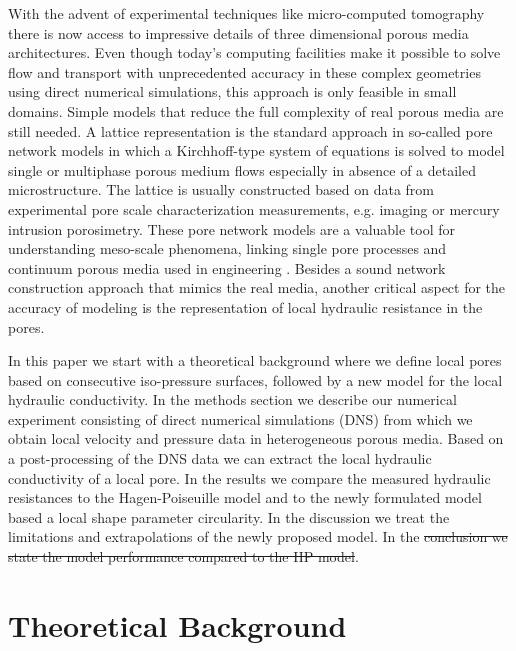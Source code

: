 \documentclass[draft]{agujournal2019}
\providecommand{\DIFadd}[1]{{\protect\color{blue}\uwave{#1}}} %
\providecommand{\DIFdel}[1]{{\protect\color{red}\sout{#1}}}                      %
\providecommand{\DIFaddbegin}{} %
\providecommand{\DIFaddend}{} %
\providecommand{\DIFdelbegin}{} %
\providecommand{\DIFdelend}{} %
\begin{document}
With the advent of experimental techniques like micro-computed tomography there is now access to impressive details of three dimensional porous media architectures. Even though today's computing facilities make it possible to solve flow and transport with unprecedented accuracy in these complex geometries using direct numerical simulations, this approach is only feasible in small domains. Simple models that reduce the full complexity of real porous media are still needed. A lattice representation is the standard approach in so-called pore network models in which a Kirchhoff-type system of equations is solved to model single or multiphase porous medium flows \cite{thompson_modeling_1997} especially in absence of a detailed microstructure. The lattice is usually constructed based on data from experimental pore scale characterization measurements, e.g. imaging or mercury intrusion porosimetry. These pore network models are a valuable tool for understanding meso-scale phenomena, linking single pore processes and continuum porous media used in engineering \cite{xiong_review_2016}. Besides a sound network construction approach that mimics the real media, another critical aspect for the accuracy of modeling is the representation of local hydraulic resistance in the pores. 


In this paper we start with a theoretical background where we define local pores based on consecutive iso-pressure surfaces, followed by a new model for the local hydraulic conductivity. In the methods section we describe our numerical experiment consisting of direct numerical simulations (DNS) from which we obtain local velocity and pressure data in heterogeneous porous media. Based on a post-processing of the DNS data we can extract the local hydraulic conductivity of a local pore. In the results we compare the measured hydraulic resistances to the Hagen-Poiseuille model and to the newly formulated model based a local shape parameter circularity. In the discussion we treat the limitations and extrapolations of the newly proposed model. In the \DIFdelbegin \DIFdel{conclusion we state the model performance compared to the HP model}\DIFdelend \DIFaddbegin \DIFadd{final chapter we provide our conclusions}\DIFaddend .


\section{Theoretical Background}
\end{document}

